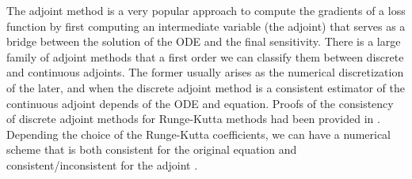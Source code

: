 The adjoint method is a very popular approach to compute the gradients of a loss function by first computing an intermediate variable (the adjoint) that serves as a bridge between the solution of the ODE and the final sensitivity. 
There is a large family of adjoint methods that a first order we can classify them between discrete and continuous adjoints. 
The former usually arises as the numerical discretization of the later, and when the discrete adjoint method is a consistent estimator of the continuous adjoint depends of the ODE and equation.  
Proofs of the consistency of discrete adjoint methods for Runge-Kutta methods had been provided in \cite{sandu2006properties, sandu2011solution}.
Depending the choice of the Runge-Kutta coefficients, we can have a numerical scheme that is both consistent for the original equation and consistent/inconsistent for the adjoint \cite{Hager_2000}.